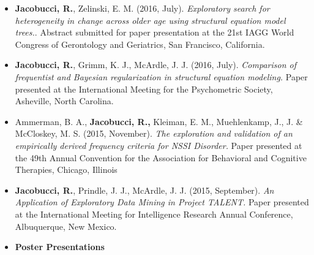 \documentclass[letterpaper,10pt]{article}
\begin{document}
\begin{itemize}
\item[] \textbf{Jacobucci, R.}, Zelinski, E. M. (2016, July). \emph{Exploratory search for heterogeneity in change across older age using structural equation model trees.}. Abstract submitted for paper presentation at the 21st IAGG World Congress of Gerontology and Geriatrics, San Francisco, California.

\item[] \textbf{Jacobucci, R.}, Grimm, K. J., McArdle, J. J. (2016, July). \emph{Comparison of frequentist and Bayesian regularization in structural equation modeling.} Paper presented at the International Meeting for the Psychometric Society, Asheville, North Carolina.
%
\item[]Ammerman, B. A., \textbf{Jacobucci, R.,} Kleiman, E. M., Muehlenkamp, J., J. \& McCloskey, M. S. (2015, November). \emph{The exploration and validation of an empirically derived frequency criteria for NSSI Disorder.} Paper presented at the 49th Annual Convention for the Association for Behavioral and Cognitive Therapies, Chicago, Illinois
%
\item[] \textbf{Jacobucci, R.}, Prindle, J. J., McArdle, J. J. (2015, September). \emph{An Application of Exploratory Data Mining in Project TALENT.} Paper presented at the International Meeting for Intelligence Research Annual Conference, Albuquerque, New Mexico.
%
\item {\textbf{\large{Poster Presentations}}}


\end{itemize}
\end{document}
